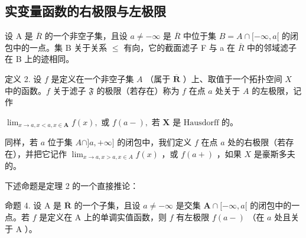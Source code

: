 \subsection{实变量函数的右极限与左极限}

设 A 是 \(\overline{R}\) 的一个非空子集，且设 \(a \neq -\infty\) 是 \(\overline{R}\) 中位于集 \(B = A \cap [-\infty, a[\) 的闭包中的一点。集 B 关于关系 \(\leqslant\) 有向，它的截面滤子 F 与 a 在 \(\overline{R}\) 中的邻域滤子在 B 上的迹相同。

定义 2. 设 \(f\) 是定义在一个非空子集 \(A\) （属于 \(\overline{\mathbf{R}}\) ）上、取值于一个拓扑空间 \(X\) 中的函数。\(f\) 关于滤子 \(\mathfrak{F}\) 的极限（若存在）称为 \(f\) 在点 \(a\) 处关于 \(A\) 的左极限，记作

\(\lim_{x \to a, x < a, x \in \mathbf{A}} f(x), \text{ 或 } f(a - ), \text{ 若 } \mathbf{X} \text{ 是 Hausdorff 的。}\)

同样，若 \(a\) 位于集 \(A \cap ]a, +\infty]\) 的闭包中，我们定义 \(f\) 在点 \(a\) 处的右极限（若存在），并把它记作 \(\lim_{x \to a, x > a, x \in A} f(x)\) ，或 \(f(a+)\) ，如果 \(X\) 是豪斯多夫的。

下述命题是定理 2 的一个直接推论：

命题 4. 设 A 是 \(\overline{\mathbf{R}}\) 的一个子集，且设 \(a \neq -\infty\) 是交集 \(\mathbf{A} \cap [-\infty, a[\) 的闭包中的一点。若 \(f\) 是定义在 A 上的单调实值函数，则 \(f\) 有左极限 \(f(a - )\) （在 \(a\) 处且关于 A ）。


